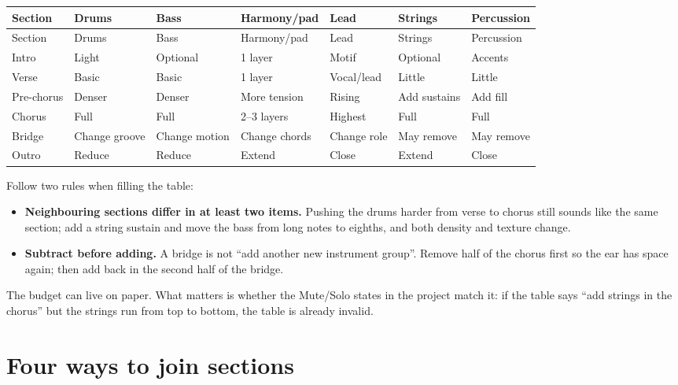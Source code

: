 \begin{longtable}{p{}p{}p{}p{}p{}p{}p{}}
\toprule
Section & Drums & Bass & Harmony/pad & Lead & Strings & Percussion \\
\midrule
\endfirsthead
\toprule
Section & Drums & Bass & Harmony/pad & Lead & Strings & Percussion \\
\midrule
\endhead
Intro & Light & Optional & 1 layer & Motif & Optional & Accents \\
Verse & Basic & Basic & 1 layer & Vocal/lead & Little & Little \\
Pre-chorus & Denser & Denser & More tension & Rising & Add sustains & Add fill \\
Chorus & Full & Full & 2--3 layers & Highest & Full & Full \\
Bridge & Change groove & Change motion & Change chords & Change role & May remove & May remove \\
Outro & Reduce & Reduce & Extend & Close & Extend & Close \\
\bottomrule
\end{longtable}

Follow two rules when filling the table:

\begin{itemize}
\item \textbf{Neighbouring sections differ in at least two items.} Pushing the drums harder from verse to chorus still sounds like the same section; add a string sustain and move the bass from long notes to eighths, and both density and texture change.
\item \textbf{Subtract before adding.} A bridge is not ``add another new instrument group''. Remove half of the chorus first so the ear has space again; then add back in the second half of the bridge.
\end{itemize}

\begin{tipbox}
The budget can live on paper. What matters is whether the Mute/Solo states in the project match it: if the table says ``add strings in the chorus'' but the strings run from top to bottom, the table is already invalid.
\end{tipbox}

\section{Four ways to join sections}
\label{sec:transitions}


